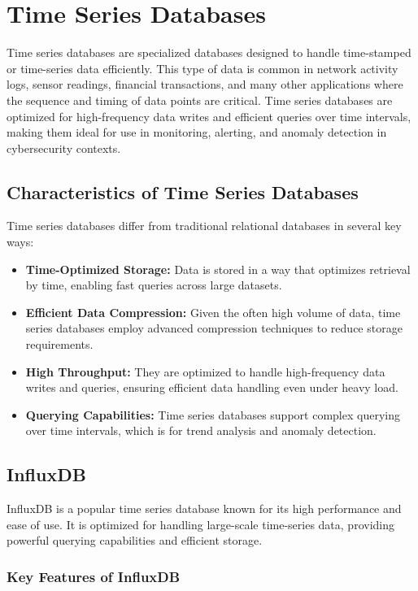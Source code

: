 \section{Time Series Databases}

Time series databases are specialized databases designed to handle time-stamped or time-series data efficiently. This type of data is common in network activity logs, sensor readings, financial transactions, and many other applications where the sequence and timing of data points are critical. Time series databases are optimized for high-frequency data writes and efficient queries over time intervals, making them ideal for use in monitoring, alerting, and anomaly detection in cybersecurity contexts.

\subsection{Characteristics of Time Series Databases}

Time series databases differ from traditional relational databases in several key ways:

\begin{itemize}
    \item \textbf{Time-Optimized Storage:} Data is stored in a way that optimizes retrieval by time, enabling fast queries across large datasets.
    \item \textbf{Efficient Data Compression:} Given the often high volume of data, time series databases employ advanced compression techniques to reduce storage requirements.
    \item \textbf{High Throughput:} They are optimized to handle high-frequency data writes and queries, ensuring efficient data handling even under heavy load.
    \item \textbf{Querying Capabilities:} Time series databases support complex querying over time intervals, which is  for trend analysis and anomaly detection.
\end{itemize}

\subsection{InfluxDB}

InfluxDB is a popular time series database known for its high performance and ease of use. It is optimized for handling large-scale time-series data, providing powerful querying capabilities and efficient storage.

\subsubsection{Key Features of InfluxDB}

